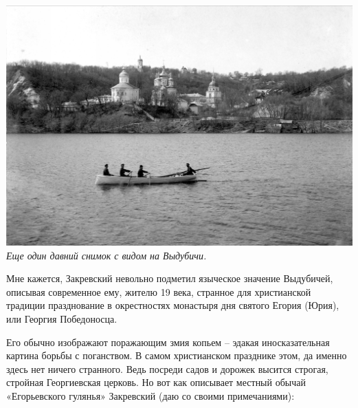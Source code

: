 \begin{center}
\includegraphics[width=\linewidth]{chast-vosp/zver/069.jpg}
\textit{Еще один давний снимок с видом на Выдубичи.}
\end{center}
\vspace*{\fill}
\newpage

Мне кажется, Закревский невольно подметил языческое значение Выдубичей, описывая современное ему, жителю 19 века, странное для христианской традиции празднование в окрестностях монастыря дня святого Егория (Юрия), или Георгия Победоносца. 

Его обычно изображают поражающим змия копьем – эдакая иносказательная картина борьбы с поганством. В самом христианском празднике этом, да именно здесь нет ничего странного. Ведь посреди садов и дорожек высится строгая, стройная Георгиевская церковь. Но вот как описывает местный обычай «Егорьевского гулянья» Закревский (даю со своими примечаниями):

